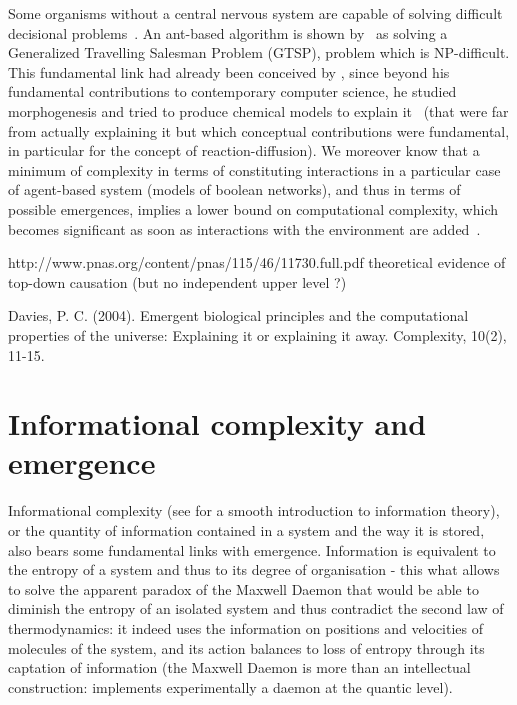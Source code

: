 Some organisms without a central nervous system are capable of solving difficult decisional problems~\cite{reid2016decision}. An ant-based algorithm is shown by~\cite{Pintea2017} as solving a Generalized Travelling Salesman Problem (GTSP), problem which is NP-difficult. This fundamental link had already been conceived by , since beyond his fundamental contributions to contemporary computer science, he studied morphogenesis and tried to produce chemical models to explain it~\cite{turing1952chemical} (that were far from actually explaining it but which conceptual contributions were fundamental, in particular for the concept of reaction-diffusion). We moreover know that a minimum of complexity in terms of constituting interactions in a particular case of agent-based system (models of boolean networks), and thus in terms of possible emergences, implies a lower bound on computational complexity, which becomes significant as soon as interactions with the environment are added~\cite{tovsic2017boolean}.



http://www.pnas.org/content/pnas/115/46/11730.full.pdf theoretical evidence of top-down causation (but no independent upper level ?)

Davies, P. C. (2004). Emergent biological principles and the computational properties of the universe: Explaining it or explaining it away. Complexity, 10(2), 11-15.







\section{Informational complexity and emergence}





Informational complexity (see \cite{dedeo2016information} for a smooth introduction to information theory), or the quantity of information contained in a system and the way it is stored, also bears some fundamental links with emergence. Information is equivalent to the entropy of a system and thus to its degree of organisation - this what allows to solve the apparent paradox of the Maxwell Daemon that would be able to diminish the entropy of an isolated system and thus contradict the second law of thermodynamics: it indeed uses the information on positions and velocities of molecules of the system, and its action balances to loss of entropy through its captation of information (the Maxwell Daemon is more than an intellectual construction: \cite{cottet2017observing} implements experimentally a daemon at the quantic level).


